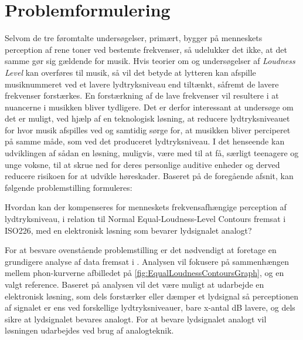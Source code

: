 \section{Problemformulering}
\label{Problemformulering}
%
Selvom de tre føromtalte undersøgelser, primært, bygger på menneskets perception af rene toner ved bestemte frekvenser, så udelukker det ikke, at det samme gør sig gældende for musik. Hvis teorier om og undersøgelser af \textit{Loudness Level} kan overføres til musik, så vil det betyde at lytteren kan afspille musiknummeret ved et lavere lydtryksniveau end tiltænkt, såfremt de lavere frekvenser forstærkes. En forstærkning af de lave frekvenser vil resultere i at nuancerne i musikken bliver tydligere. Det er derfor interessant at undersøge om det er muligt, ved hjælp af en teknologisk løsning, at reducere lydtryksniveauet for hvor musik afspilles ved og samtidig sørge for, at musikken bliver perciperet på samme måde, som ved det produceret lydtryksniveau. I det henseende kan udviklingen af sådan en løsning, muligvis, være med til at få, særligt teenagere og unge voksne, til at skrue ned for deres personlige auditive enheder og derved reducere risikoen for at udvikle høreskader.
\blankline
Baseret på de foregående afsnit, kan følgende problemstilling formuleres:
%
\newcommand{\problemformulering}{
\begin{quoteemph}
Hvordan kan der kompenseres for menneskets frekvensafhængige perception af lydtryksniveau, i relation til Normal Equal-Loudness-Level Contours fremsat i ISO226, med en elektronisk løsning som bevarer lydsignalet analogt? 
\end{quoteemph}
}
\problemformulering %
%
For at besvare ovenstående problemstilling er det nødvendigt at foretage en grundigere analyse af data fremsat i \textcite{STD:ISO226}. Analysen vil fokusere på sammenhængen mellem phon-kurverne afbilledet på \autoref{fig:EqualLoudnessContoursGraph}, og en valgt reference. Baseret på analysen vil det være muligt at udarbejde en elektronisk løsning, som dels forstærker eller dæmper et lydsignal så perceptionen af signalet er ens ved forskellige lydtryksniveauer, bare x-antal dB lavere, og dels sikre at lydsignalet bevares analogt. For at bevare lydsignalet analogt vil løsningen udarbejdes ved brug af analogteknik.